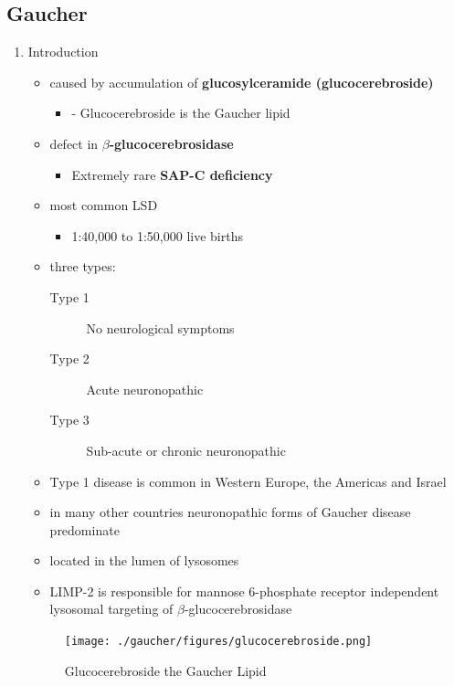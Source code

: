 \documentclass{scrartcl}
\begin{document}
\subsection{Gaucher}
\label{sec:org33de786}
\begin{enumerate}
\item Introduction
\label{sec:orgf143b7c}
\begin{itemize}
\item caused by accumulation of \textbf{glucosylceramide (glucocerebroside)}
\begin{itemize}
\item - Glucocerebroside is the Gaucher lipid
\end{itemize}
\item defect in \textbf{\(\beta\)-glucocerebrosidase}
\begin{itemize}
\item Extremely rare \textbf{SAP-C deficiency}
\end{itemize}
\item most common LSD
\begin{itemize}
\item 1:40,000 to 1:50,000 live births
\end{itemize}
\item three types:
\begin{description}
\item[{Type 1}] No neurological symptoms
\item[{Type 2}] Acute neuronopathic
\item[{Type 3}] Sub-acute or chronic neuronopathic
\end{description}
\item Type 1 disease is common in Western Europe, the Americas and Israel
\item in many other countries neuronopathic forms of Gaucher disease predominate
\end{itemize}


\begin{itemize}
\item located in the lumen of lysosomes
\item LIMP-2 is responsible for mannose 6-phosphate receptor independent
lysosomal targeting of \(\beta\)-glucocerebrosidase
\end{itemize}

\begin{figure}[htbp]
\centering
\texttt{[image: ./gaucher/figures/glucocerebroside.png]}
\caption{\label{fig:org71553b5}
Glucocerebroside the Gaucher Lipid}
\end{figure}


\end{enumerate}
\end{document}
